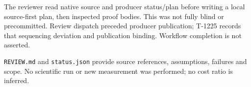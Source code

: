 \documentclass[10pt]{article}
\begin{document}
The reviewer read native source and producer status/plan before writing a local source-first plan, then inspected proof bodies. This was not fully blind or precommitted. Review dispatch preceded producer publication; T-1225 records that sequencing deviation and publication binding. Workflow completion is not asserted.

\texttt{REVIEW.md} and \texttt{status.json} provide source references, assumptions, failures and scope. No scientific run or new measurement was performed; no cost ratio is inferred.
\end{document}

